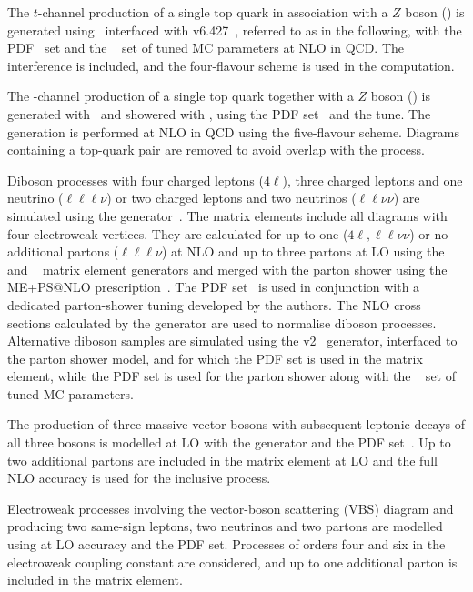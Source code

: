 The $t$-channel production of a single top quark in association with a $Z$ boson
(\tZ) is generated using \MGAMC\ interfaced with \PYTHIA v6.427~\cite{PythiaManual}, 
referred to as  in the following, 
with the  PDF~\cite{cteq6} set and the ~\cite{Skands:2010ak} 
set of tuned MC parameters at NLO in QCD. The \Zgamstar interference is
included, and the four-flavour scheme is used in the computation. 

The \Wt-channel production of a single top quark together with a $Z$ boson
(\WtZ) is generated with  \MGAMC\ and showered with , using the 
 PDF set~\cite{Ball:2015cx} and the  tune. The generation is performed at
NLO in QCD using the five-flavour scheme. 
Diagrams containing a top-quark pair are removed to avoid 
overlap with the \ttZ process.

Diboson processes with four charged leptons ($4\ell$), three charged leptons and
one neutrino ($\ell\ell\ell\nu$) or two charged leptons and two neutrinos
($\ell\ell\nu\nu$) are simulated using the 
generator~\cite{Gleisberg:2008ta}. 
The matrix elements include all diagrams with four electroweak vertices. 
They are calculated for up to one ($4\ell,
\ell\ell\nu\nu$) or no additional partons ($\ell\ell\ell\nu$) at NLO and up to three
partons at LO using the \COMIX~\cite{Gleisberg:2008fv} and
\OPENLOOPS~\cite{Cascioli:2011va} matrix element generators and merged with the
\SHERPA parton shower using the \textsc{ME+PS@NLO}
prescription~\cite{Hoeche:2012yf}. The  PDF set~\cite{Lai:2010vv} is used in conjunction
with a dedicated parton-shower tuning developed by the \SHERPA authors. The NLO
cross sections calculated by the generator are used to normalise diboson
processes.  Alternative diboson samples are simulated using the \POWHEGBOX
v2~\cite{Powbox2} generator, interfaced to the  parton shower model,
and for which the  PDF set is used in the matrix element, while the
 PDF set is used for the parton shower along with the
~\cite{AZNLO:2014} set of tuned MC parameters.

The production of three massive vector bosons with subsequent leptonic decays of
all three bosons is modelled at LO with the  generator and the
 PDF set~\cite{Lai:2010vv}. Up to two additional partons are included in the matrix
element at LO and the full NLO accuracy is used for the inclusive process.  

Electroweak processes involving the vector-boson scattering (VBS) diagram and
producing two same-sign leptons,  two neutrinos and two partons are modelled
using  at LO accuracy and the  PDF set. Processes of
orders four and six in the electroweak coupling constant are considered, and up
to one additional parton is included in the matrix element. 

